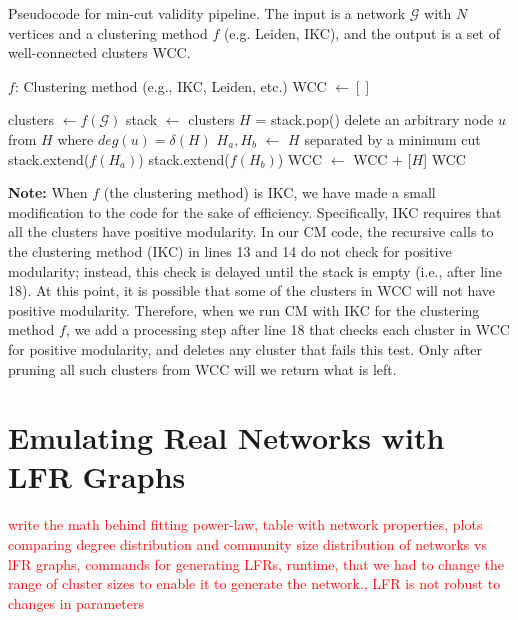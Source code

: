 \documentclass[a4paper]{article}   	%
\begin{document}
\clearpage
\begin{algorithm}[h]
\caption{Pseudocode for min-cut validity pipeline. The input is a network $\mathcal{G}$ with $N$ vertices and a clustering method $f$ (e.g. Leiden, IKC), and the output is a set of well-connected clusters WCC.}
\begin{algorithmic}[2]
\State $f$: Clustering method (e.g., IKC, Leiden, etc.)
\State WCC $\gets []$ 

\State clusters $\gets f(\mathcal{G})$ 
\State stack $\gets$ clusters
 
    \State $H$ = stack.pop()
    \State delete an arbitrary node $u$ from $H$ where $deg(u) = \delta(H)$
    \EndWhile
     
        \State $H_a, H_b$ $\gets$ $H$ separated by a minimum cut
        \State stack.extend($f(H_a)$) 
        \State stack.extend($f(H_b)$)  
    \Else
            \State WCC $\gets$ WCC $+$ [$H$] 
        \EndIf
\EndWhile
\State \Return WCC 
\EndFunction
\end{algorithmic}

\label{alg:full-pipeline}
\end{algorithm}

\textbf{Note:} When
$f$ (the clustering method) is IKC, we have made a small modification to the
code for the sake of efficiency.
Specifically, IKC requires that all the clusters have positive modularity.
 In our CM code, the recursive
calls to the clustering method (IKC) in lines 13 and 14 do not check for positive modularity; instead, this check is delayed until the stack is empty (i.e., after line 18).
At this point, it is possible that some of the clusters in WCC will not have positive modularity.
Therefore, when we run CM with IKC for the clustering method $f$,  we add a processing step after line 18 that checks each cluster in WCC for positive modularity,
and deletes any cluster that fails this test.
Only after pruning all such clusters from WCC will we return what is left.

\clearpage
\section{Emulating Real Networks with LFR Graphs}

\textcolor{red}{write the math behind fitting power-law, table with network properties, plots comparing degree distribution and community size distribution of networks vs lFR graphs, commands for generating LFRs, runtime, that we had to change the range of cluster sizes to enable it to generate the network., LFR is not robust to changes in parameters}



\end{document}

